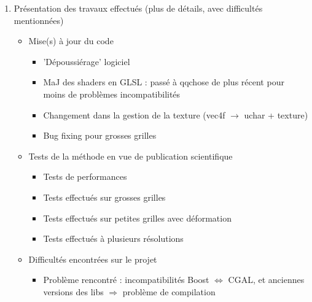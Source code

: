 {{\begin{enumerate}
\begin{itemize}
				\item Génération de maillage tétrahédrique à partir de maillage surfacique englobant (version binaire de la grille $\rightarrow$ maillage tétra, binariser grille $\rightarrow$ dilatation, et maillage autour de ca)
				\item (Rapide) Raymarching/Bresenham pour trouver voxel, et estimer normale et couleur
				\item Note : mentionner le fait que du coup, la complexité revient à la taille du framebuffer, non de la grille
				\item Effet de bord : on peut donc charger des grilles rentrant sur GPU, les déformer afin d'avoir une grille techniquement + grande que espace mémoire GPU
			\end{itemize}
			\item Présentation des travaux effectués (plus de détails, avec difficultés mentionnées)~\begin{itemize}
				\item Mise(s) à jour du code~\begin{itemize}
					\item 'Dépoussiérage' logiciel
					\item MaJ des shaders en GLSL : passé à qqchose de plus récent pour moins de problèmes incompatibilités
					\item Changement dans la gestion de la texture (vec4f $\rightarrow$ uchar + texture)
					\item Bug fixing pour grosses grilles
				\end{itemize}
				\item Tests de la méthode en vue de publication scientifique~\begin{itemize}
					\item Tests de performances
					\item Tests effectués sur grosses grilles
					\item Tests effectués sur petites grilles avec déformation
					\item Tests effectués à plusieurs résolutions
				\end{itemize}
				\item Difficultés encontrées sur le projet~\begin{itemize}
					\item Problème rencontré : incompatibilités Boost $\Leftrightarrow$ CGAL, et anciennes versions des libs $\Rightarrow$ problème de compilation

\end{itemize}
\end{itemize}
\end{enumerate}}}

